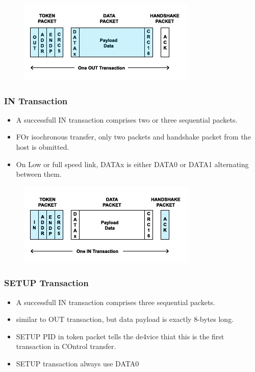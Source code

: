 \documentclass{article}
\begin{document}
\begin{figure}[H]
    \centering
    \includegraphics[]{DocuResources/OUTTrans.jpg}
\end{figure}

\subsubsection{IN Transaction}
\begin{itemize}
    \item A successfull IN transaction comprises two or three sequential packets.
    \item FOr isochronous transfer, only two packets and handshake packet from the host is obmitted.
    \item On Low or full speed link, DATAx is either DATA0 or DATA1 alternating between them.
\end{itemize}

\begin{figure}[H]
    \centering
    \includegraphics[]{DocuResources/INTrans.jpg}
\end{figure}

\subsubsection{SETUP Transaction}
\begin{itemize}
    \item A successfull IN transaction comprises three sequential packets.
    \item similar to OUT transaction, but data payload is exactly 8-bytes long.
    \item SETUP PID in token packet tells the de4vice thiat this is the first transaction in COntrol transfer.
    \item SETUP transaction always use DATA0
\end{itemize}
\end{document}
